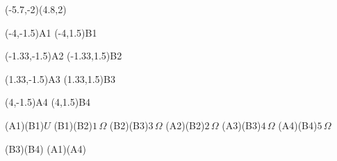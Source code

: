 \pspicture*(-5.7,-2)(4.8,2)


\pnode(-4,-1.5){A1}
\pnode(-4,1.5){B1}

\pnode(-1.33,-1.5){A2}
\pnode(-1.33,1.5){B2}

\pnode(1.33,-1.5){A3}
\pnode(1.33,1.5){B3}

\pnode(4,-1.5){A4}
\pnode(4,1.5){B4}

\Ucc[labelInside=2,labeloffset=11mm](A1)(B1){$U$}
\resistor[labeloffset=-6mm](B1)(B2){$1\,\Omega$}
\resistor[labeloffset=-6mm](B2)(B3){$3\,\Omega$}
\resistor[labeloffset=7mm](A2)(B2){$2\,\Omega$}
\resistor[labeloffset=7mm](A3)(B3){$4\,\Omega$}
\resistor[labeloffset=7mm](A4)(B4){$5\,\Omega$}

\wire(B3)(B4)
\wire(A1)(A4)

\endpspicture